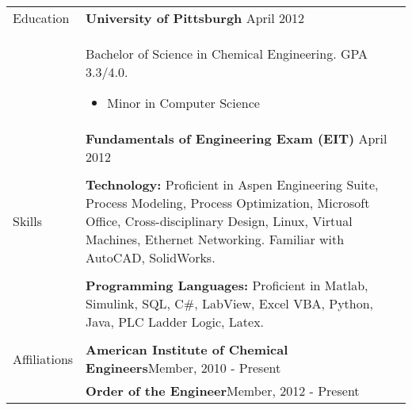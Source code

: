 \documentclass[11pt]{article}
\begin{document}
\begin{tabular}[t]{@{}p{1.15in} @{}p{5.35in}}
	{Education} &

		\textbf{University of Pittsburgh} \hfill April 2012\vspace{0.015in} \\ &
		Bachelor of Science in Chemical Engineering. GPA 3.3/4.0. \vspace{0.015in}
		\begin{itemize}
			\renewcommand{\labelitemi}{$\diamond$}
			\item Minor in Computer Science
		\end{itemize} \\ &
		
		\textbf{Fundamentals of Engineering Exam (EIT)} \hfill April 2012 \\\\

	{Skills} &

		\textbf{Technology:} Proficient in Aspen Engineering
Suite, Process Modeling, Process Optimization, Microsoft Office, Cross-disciplinary Design, Linux, Virtual Machines, Ethernet Networking. Familiar with AutoCAD, SolidWorks.\\\\ &

		\textbf{Programming Languages:} Proficient in Matlab, Simulink, SQL, C\#, LabView, Excel VBA, Python, Java, PLC Ladder Logic, Latex.\\\\
		
	{Affiliations} &

		\textbf{American Institute of Chemical Engineers}\hfill{Member, 2010 - Present}\\&

		\textbf{Order of the Engineer}\hfill{Member, 2012 - Present}

\end{tabular}
\end{document}
